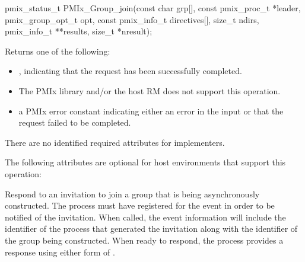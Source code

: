 \format

\cspecificstart
\begin{codepar}
pmix_status_t
PMIx_Group_join(const char grp[],
                const pmix_proc_t *leader,
                pmix_group_opt_t opt,
                const pmix_info_t directives[], size_t ndirs,
                pmix_info_t **results, size_t *nresult);
\end{codepar}
\cspecificend

\begin{arglist}
\end{arglist}

Returns one of the following:

\begin{itemize}
    \item {}, indicating that the request has been successfully completed.
    \item {} The \ac{PMIx} library and/or the host \ac{RM} does not support this operation.
    \item a \ac{PMIx} error constant indicating either an error in the input or that the request failed to be completed.
\end{itemize}

\reqattrstart
There are no identified required attributes for implementers.

\reqattrend

\optattrstart
The following attributes are optional for host environments that support this operation:


\optattrend

\descr

Respond to an invitation to join a group that is being asynchronously constructed. The process must have registered for the  event in order to be notified of the invitation. When called, the event information will include the  identifier of the process that generated the invitation along with the identifier of the group being constructed. When ready to respond, the process provides a response using either form of .

